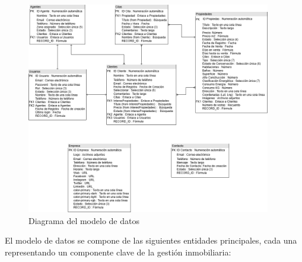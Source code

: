 \begin{figure}[H]
    \begin{center}
        \includegraphics[width = 0.95\textwidth]{Figuras/diagrama_modelo_de_datos.png}
    \end{center}
    \caption{\label{fig:diagrama_modelo_de_datos} Diagrama del modelo de datos}
\end{figure}

El modelo de datos se compone de las siguientes entidades principales, cada una representando un componente clave de la gestión inmobiliaria:

